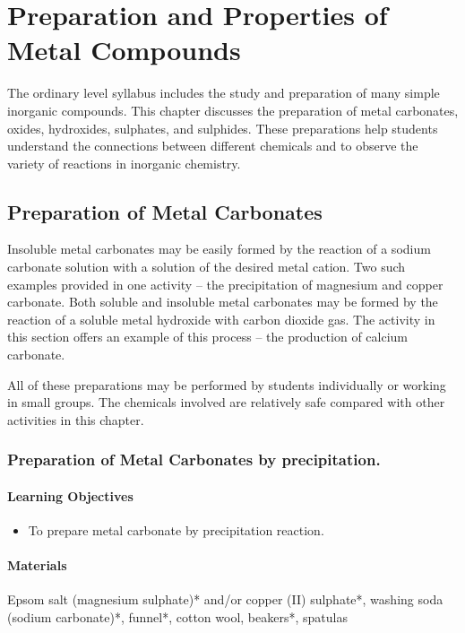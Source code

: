 \chapter{Preparation and Properties of Metal Compounds}

The ordinary level syllabus includes the study and preparation of many simple inorganic compounds. This chapter discusses the preparation of metal carbonates, oxides, hydroxides, sulphates, and sulphides. These preparations help students understand the connections between different chemicals and to observe the variety of reactions in inorganic chemistry.

\section{Preparation of Metal Carbonates}

Insoluble metal carbonates may be easily formed by the reaction of a sodium carbonate solution with a solution of the desired metal cation. Two such examples provided in one activity -- the precipitation of magnesium and copper carbonate. Both soluble and insoluble metal carbonates may be formed by the reaction of a soluble metal hydroxide with carbon dioxide gas. The activity in this section offers an example of this process -- the production of calcium carbonate.

All of these preparations may be performed by students individually or working in small groups. The chemicals involved are relatively safe compared with other activities in this chapter.

\subsection{Preparation of Metal Carbonates by precipitation.}

\subsubsection*{Learning Objectives}
\begin{itemize}
\item{To prepare metal carbonate by precipitation reaction.}
\end{itemize}

\subsubsection*{Materials}
Epsom salt (magnesium sulphate)* and/or copper (II) sulphate*, washing soda (sodium carbonate)*, funnel*, cotton wool, beakers*, spatulas

